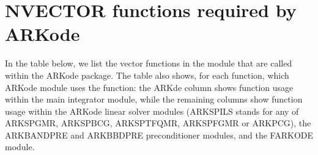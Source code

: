 \documentclass[letterpaper,10pt,english]{sphinxmanual}
\begin{document}
\section{NVECTOR functions required by ARKode}
\label{nvectors/ARKode_requirements::doc}\label{nvectors/ARKode_requirements:nvector-functions-required-by-arkode}\label{nvectors/ARKode_requirements:nvectors-arkode}
In the table below, we list the vector functions in the 
module that are called within the ARKode package.  The table also
shows, for each function, which ARKode module uses the function:
the ARKde column shows function usage within the main integrator
module,  while the remaining columns show function usage within
the ARKode linear solver modules (ARKSPILS stands for any of
ARKSPGMR, ARKSPBCG, ARKSPTFQMR, ARKSPFGMR or ARKPCG), the ARKBANDPRE
and ARKBBDPRE preconditioner modules, and the FARKODE module.
\end{document}
